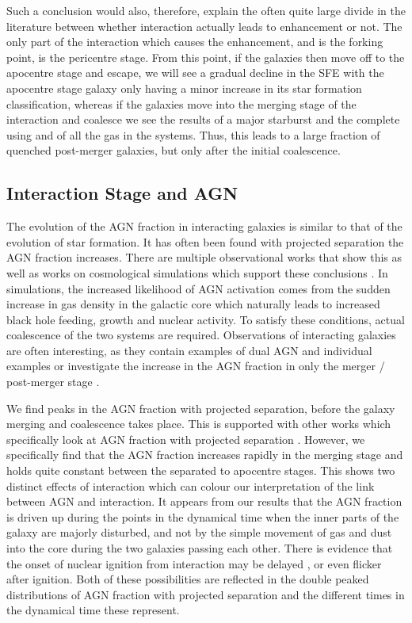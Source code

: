 Such a conclusion would also, therefore, explain the often quite large divide in the literature between whether interaction actually leads to enhancement or not. The only part of the interaction which causes the enhancement, and is the forking point, is the pericentre stage. From this point, if the galaxies then move off to the apocentre stage and escape, we will see a gradual decline in the SFE with the apocentre stage galaxy only having a minor increase in its star formation classification, whereas if the galaxies move into the merging stage of the interaction and coalesce we see the results of a major starburst and the complete using and of all the gas in the systems. Thus, this leads to a large fraction of quenched post-merger galaxies, but only after the initial coalescence. 

\subsection{Interaction Stage and AGN}
\noindent The evolution of the AGN fraction in interacting galaxies is similar to that of the evolution of star formation. It has often been found with projected separation the AGN fraction increases. There are multiple observational works that show this \citep{2007MNRAS.375.1017A, 2013MNRAS.435.3627E, 2020ApJ...904..107S} as well as works on cosmological simulations which support these conclusions \citep{2023MNRAS.519.4966B}. In simulations, the increased likelihood of AGN activation comes from the sudden increase in gas density in the galactic core which naturally leads to increased black hole feeding, growth and nuclear activity. To satisfy these conditions, actual coalescence of the two systems are required. Observations of interacting galaxies are often interesting, as they contain examples of dual AGN and individual examples \citep[e.g.][]{2017MNRAS.470L..49E, 2021ApJ...923...36S} or investigate the increase in the AGN fraction in only the merger / post-merger stage \citep{2020A&A...637A..94G}.

We find peaks in the AGN fraction with projected separation, before the galaxy merging and coalescence takes place. This is supported with other works which specifically look at AGN fraction with projected separation \citep{2011MNRAS.418.2043E, 2023ApJ...942..107S}. However, we specifically find that the AGN fraction increases rapidly in the merging stage and holds quite constant between the separated to apocentre stages. This shows two distinct effects of interaction which can colour our interpretation of the link between AGN and interaction. It appears from our results that the AGN fraction is driven up during the points in the dynamical time when the inner parts of the galaxy are majorly disturbed, and not by the simple movement of gas and dust into the core during the two galaxies passing each other. There is evidence that the onset of nuclear ignition from interaction may be delayed \citep{2011MNRAS.418.2043E}, or even flicker \citep{2015MNRAS.451.2517S} after ignition. Both of these possibilities are reflected in the double peaked distributions of AGN fraction with projected separation and the different times in the dynamical time these represent.

